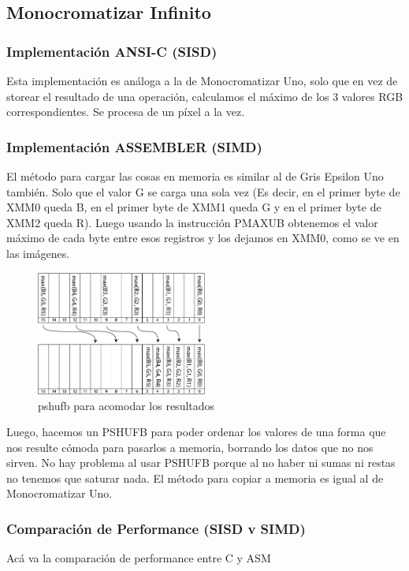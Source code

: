         \subsection{Monocromatizar Infinito}
            \subsubsection{Implementación ANSI-C (SISD)}
                Esta implementación es análoga a la de Monocromatizar Uno, solo que en vez de storear el resultado de una operación, calculamos el máximo de los 3 valores RGB correspondientes. Se procesa de un píxel a la vez. 
            \subsubsection{Implementación ASSEMBLER (SIMD)}
                El método para cargar las cosas en memoria es similar al de Gris Epsilon Uno también. Solo que el valor G se carga una sola vez (Es decir, en el primer byte de XMM0 queda B, en el primer byte de XMM1 queda G y en el primer byte de XMM2 queda R). Luego usando la instrucción PMAXUB obtenemos el valor máximo de cada byte entre esos registros y los dejamos en XMM0, como se ve en las imágenes.
                
                \begin{figure}[htb]
                \begin{center}
                \leavevmode
                \includegraphics[width=0.5\textwidth]{gris_epsilon_infinito_pshub.png}
                \end{center}
                \caption{pshufb para acomodar los resultados}
                \end{figure}
                
                Luego, hacemos un PSHUFB para poder ordenar los valores de una forma que nos resulte cómoda para pasarlos a memoria, borrando los datos que no nos sirven. No hay problema al usar PSHUFB porque al no haber ni sumas ni restas no tenemos que saturar nada. El método para copiar a memoria es igual al de Monocromatizar Uno.

        \subsubsection{Comparación de Performance (SISD v SIMD)}

Acá va la comparación de performance entre C y ASM

